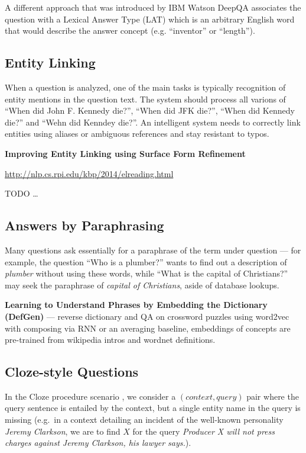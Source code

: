 A different approach that was introduced by IBM Watson DeepQA \citep{WatsonTyCor}
associates the question with a Lexical Answer Type (LAT) which is
an arbitrary English word that would describe the answer concept
(e.g. ``inventor'' or ``length'').

\subsection{Entity Linking}
\label{sec:entitylink}

When a question is analyzed, one of the main tasks is typically recognition
of entity mentions in the question text.  The system should process all
varions of ``When did John F. Kennedy die?'', ``When did JFK die?'',
``When did Kennedy die?'' and ``Wehn did Kenndey die?''.  An intelligent
system needs to correctly link entities using aliases or ambiguous
references and stay resistant to typos.

\textbf{Improving Entity Linking using Surface Form Refinement}

\url{http://nlp.cs.rpi.edu/kbp/2014/elreading.html}

TODO \dots

\subsection{Answers by Paraphrasing}

Many questions ask essentially for a paraphrase of the term under
question --- for example, the question ``Who is a plumber?'' wants
to find out a description of \textit{plumber} without using these
words, while ``What is the capital of Christians?'' may seek the
paraphrase of \textit{capital of Christians}, aside of database lookups.

\textbf{Learning to Understand Phrases by Embedding the Dictionary (DefGen)} \citep{DefGen}
	--- reverse dictionary and QA on crossword puzzles using word2vec
	with composing via RNN or an averaging baseline, embeddings of
	concepts are pre-trained from wikipedia intros and wordnet definitions.

\subsection{Cloze-style Questions}

In the Cloze procedure scenario \citep{Cloze},
we consider a $(context, query)$ pair where the query
sentence is entailed by the context, but a single entity name in the query
is missing (e.g.\ in a context detailing an incident of the well-known personality
\textit{Jeremy Clarkson}, we are to find $X$ for the query
\textit{Producer X will not press charges against Jeremy Clarkson, his lawyer says.}).

